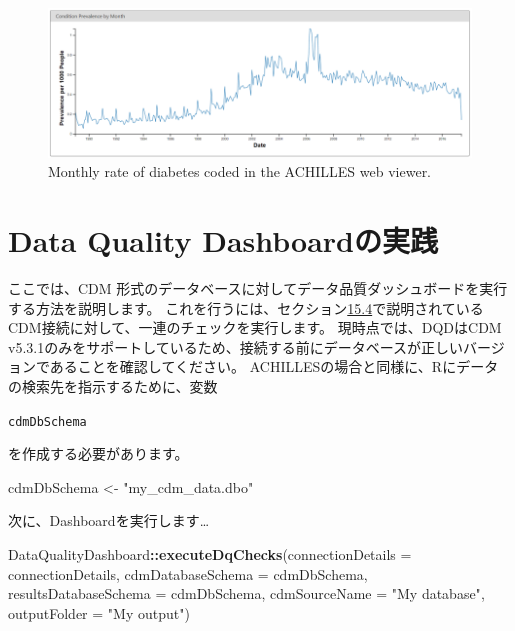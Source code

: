 \documentclass[
  11pt]{book}
\newenvironment{Shaded}{\begin{snugshade}}{\end{snugshade}}
\newcommand{\AttributeTok}[1]{\textcolor[rgb]{0.13,0.29,0.53}{#1}}
\newcommand{\FunctionTok}[1]{\textcolor[rgb]{0.13,0.29,0.53}{\textbf{#1}}}
\newcommand{\NormalTok}[1]{#1}
\newcommand{\OtherTok}[1]{\textcolor[rgb]{0.56,0.35,0.01}{#1}}
\newcommand{\SpecialCharTok}[1]{\textcolor[rgb]{0.81,0.36,0.00}{\textbf{#1}}}
\newcommand{\StringTok}[1]{\textcolor[rgb]{0.31,0.60,0.02}{#1}}
\theoremstyle{definition}
\theoremstyle{definition}
\theoremstyle{definition}
\theoremstyle{definition}
\theoremstyle{remark}
\begin{document}
\begin{figure}

{\centering \includegraphics[width=1\linewidth]{images/DataQuality/achillesCodeChange} 

}

\caption{Monthly rate of diabetes coded in the ACHILLES web viewer.}\label{fig:achillesCodeChange}
\end{figure}

\section{Data Quality Dashboardの実践}\label{dqdInPractice}

ここでは、CDM 形式のデータベースに対してデータ品質ダッシュボードを実行する方法を説明します。 これを行うには、セクション\href{https://ohdsi.github.io/TheBookOfOhdsi/DataQuality.html\#achillesInPractice}{15.4}で説明されているCDM接続に対して、一連のチェックを実行します。 現時点では、DQDはCDM v5.3.1のみをサポートしているため、接続する前にデータベースが正しいバージョンであることを確認してください。 ACHILLESの場合と同様に、Rにデータの検索先を指示するために、変数

\texttt{cdmDbSchema}

を作成する必要があります。

\begin{Shaded}
\begin{Highlighting}[]
\NormalTok{cdmDbSchema }\OtherTok{\textless{}{-}} \StringTok{"my\_cdm\_data.dbo"}
\end{Highlighting}
\end{Shaded}

次に、Dashboardを実行します\ldots{}

\begin{Shaded}
\begin{Highlighting}[]
\NormalTok{DataQualityDashboard}\SpecialCharTok{::}\FunctionTok{executeDqChecks}\NormalTok{(}\AttributeTok{connectionDetails =}\NormalTok{ connectionDetails,}
                                      \AttributeTok{cdmDatabaseSchema =}\NormalTok{ cdmDbSchema,}
                                      \AttributeTok{resultsDatabaseSchema =}\NormalTok{ cdmDbSchema,}
                                      \AttributeTok{cdmSourceName =} \StringTok{"My database"}\NormalTok{,}
                                      \AttributeTok{outputFolder =} \StringTok{"My output"}\NormalTok{)}
\end{Highlighting}
\end{Shaded}
\end{document}
